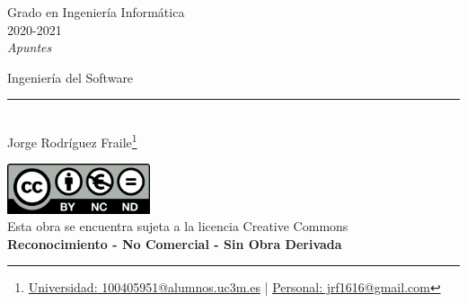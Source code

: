 \documentclass[12pt, twoside, openright]{report} %
\begin{document}

\begin{titlepage}
	\begin{sffamily}
		\color{azulUC3M}
		\begin{center}
			\begin{figure}[H] %
			\end{figure}
			\vspace{2.5cm}
			\begin{Large}
				Grado en Ingeniería Informática\\
				2020-2021\\
				\vspace{2cm}
				\textsl{Apuntes}\\
				\bigskip
			\end{Large}
			{\Huge Ingeniería del Software}\\
			\vspace*{0.5cm}
			\rule{10.5cm}{0.1mm}\\
			\vspace*{0.9cm}
			{\LARGE Jorge Rodríguez Fraile\footnote{\href{mailto:100405951@alumnos.uc3m.es}{Universidad: 100405951@alumnos.uc3m.es}  |  \href{mailto:jrf1616@gmail.com}{Personal: jrf1616@gmail.com}}}\\
			\vspace*{1cm}
		\end{center}
		\vfill
		\color{black}
		\includegraphics[width=4.2cm]{img/creativecommons.png}\\
		Esta obra se encuentra sujeta a la licencia Creative Commons\\ \textbf{Reconocimiento - No Comercial - Sin Obra Derivada}
	\end{sffamily}
\end{titlepage}


\tableofcontents
\thispagestyle{fancy}
\end{document}
